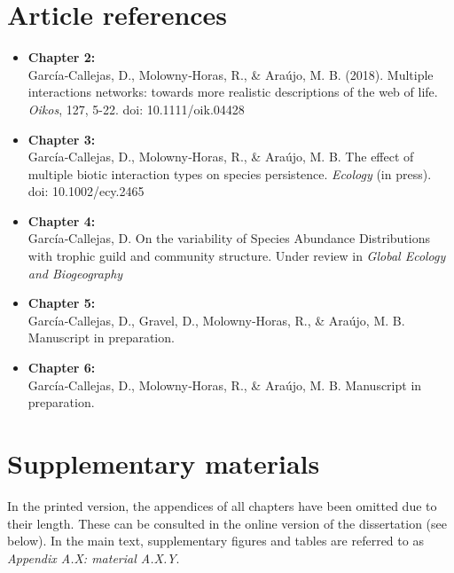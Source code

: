 \documentclass[10pt,a4paper,twoside,fleqn,showtrims]{memoir}
\begin{document}
\begin{abstract}
\end{abstract}

\clearpage


\section*{Article references}

\begin{itemize}
  \item \textbf{Chapter 2:} \\
  García‐Callejas, D., Molowny‐Horas, R., \& Araújo, M. B. (2018). Multiple interactions networks: towards more realistic descriptions of the web of life. \textit{Oikos}, 127, 5-22. doi: 10.1111/oik.04428
  \item \textbf{Chapter 3:} \\
  García‐Callejas, D., Molowny‐Horas, R., \& Araújo, M. B. The effect of multiple biotic interaction types on species persistence. \textit{Ecology} (in press). doi: 10.1002/ecy.2465
  \item \textbf{Chapter 4:} \\
  García‐Callejas, D. On the variability of Species Abundance Distributions with trophic guild and community structure. Under review in \textit{Global Ecology and Biogeography}
  \item \textbf{Chapter 5:} \\
  García‐Callejas, D., Gravel, D., Molowny‐Horas, R., \& Araújo, M. B. Manuscript in preparation.
  \item \textbf{Chapter 6:} \\
  García‐Callejas, D., Molowny‐Horas, R., \& Araújo, M. B. Manuscript in preparation.
\end{itemize}

\section*{Supplementary materials}

In the printed version, the appendices of all chapters have been omitted due to their length. These can be consulted in the online version of the dissertation (see below). In the main text, supplementary figures and tables are referred to as \textit{Appendix A.X: material A.X.Y}.
\end{document}
